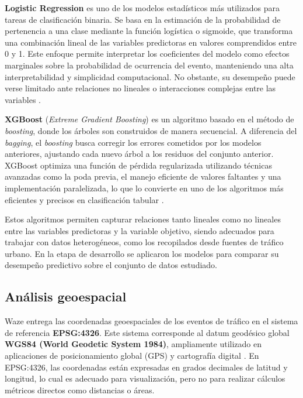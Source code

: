 \documentclass[12pt]{article}
\begin{document}
\textbf{Logistic Regression} es uno de los modelos estadísticos más utilizados para tareas de clasificación binaria. Se basa en la estimación de la probabilidad de pertenencia a una clase mediante la función logística o sigmoide, que transforma una combinación lineal de las variables predictoras en valores comprendidos entre 0 y 1. Este enfoque permite interpretar los coeficientes del modelo como efectos marginales sobre la probabilidad de ocurrencia del evento, manteniendo una alta interpretabilidad y simplicidad computacional. No obstante, su desempeño puede verse limitado ante relaciones no lineales o interacciones complejas entre las variables \parencite{hosmer2013applied}.

\textbf{XGBoost} (\textit{Extreme Gradient Boosting}) es un algoritmo basado en el método de \textit{boosting}, donde los árboles son construidos de manera secuencial. A diferencia del \textit{bagging}, el \textit{boosting} busca corregir los errores cometidos por los modelos anteriores, ajustando cada nuevo árbol a los residuos del conjunto anterior. XGBoost optimiza una función de pérdida regularizada utilizando técnicas avanzadas como la poda previa, el manejo eficiente de valores faltantes y una implementación paralelizada, lo que lo convierte en uno de los algoritmos más eficientes y precisos en clasificación tabular \parencite{chen2016xgboost}.

Estos algoritmos permiten capturar relaciones tanto lineales como no lineales entre las variables predictoras y la variable objetivo, siendo adecuados para trabajar con datos heterogéneos, como los recopilados desde fuentes de tráfico urbano. En la etapa de desarrollo se aplicaron los modelos para comparar su desempeño predictivo sobre el conjunto de datos estudiado.

\subsection{Análisis geoespacial}

Waze entrega las coordenadas geoespaciales de los eventos de tráfico en el sistema de referencia \textbf{EPSG:4326}. Este sistema corresponde al datum geodésico global \textbf{WGS84 (World Geodetic System 1984)}, ampliamente utilizado en aplicaciones de posicionamiento global (GPS) y cartografía digital \parencite{epsg4326, wgs84_nima}. En EPSG:4326, las coordenadas están expresadas en grados decimales de latitud y longitud, lo cual es adecuado para visualización, pero no para realizar cálculos métricos directos como distancias o áreas.
\end{document}
